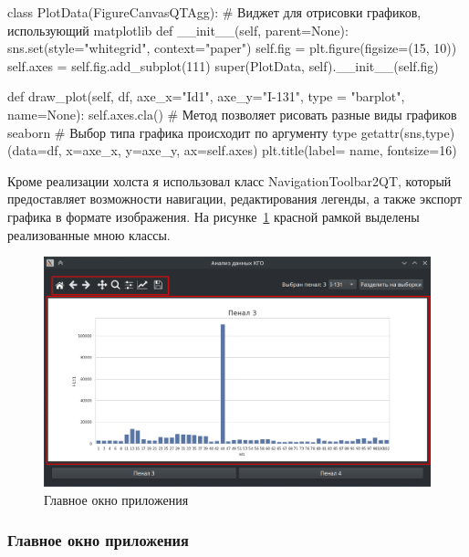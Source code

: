 \begin{flushleft}
 \label{lst:canvas}
\begin{MyCodes}
class PlotData(FigureCanvasQTAgg): 
	# Виджет для отрисовки графиков, использующий matplotlib
	def __init__(self, parent=None):
		sns.set(style="whitegrid", context="paper")
		self.fig = plt.figure(figsize=(15, 10))
		self.axes = self.fig.add_subplot(111)
		super(PlotData, self).__init__(self.fig)
	
	def draw_plot(self, df, axe_x="Id1",
			axe_y="I-131", type = "barplot", name=None):
		self.axes.cla()
		# Метод позволяет рисовать разные виды графиков seaborn
		# Выбор типа графика происходит по аргументу type
		getattr(sns,type)(data=df, x=axe_x, y=axe_y, ax=self.axes)
		plt.title(label= name, fontsize=16)
\end{MyCodes}
\end{flushleft}

Кроме реализации холста я использовал класс NavigationToolbar2QT, который предоставляет возможности навигации, редактирования легенды, а также экспорт графика в формате изображения. На рисунке~\ref{fig:ris8} красной рамкой выделены реализованные мною классы.

\begin{figure}[H]
	\centering
	\includegraphics[width=0.96\linewidth]{pics/ris8} %
	\caption{Главное окно приложения}
	\label{fig:ris8} %
\end{figure}

\subsubsection{Главное окно приложения}


